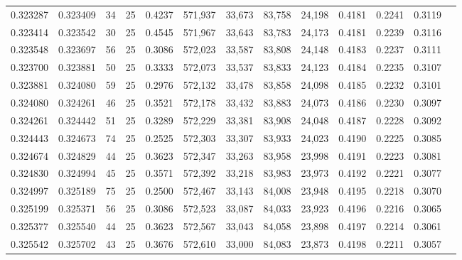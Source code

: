 \begin{tabular}{rrrrrrrrrrrrr}
0.323287 & 0.323409 &    34 &  25 &                                     0.4237 & 571,937 &  33,673 &  83,758 &  24,198 & 0.4181 & 0.2241 & 0.3119 \\
0.323414 & 0.323542 &    30 &  25 &                                     0.4545 & 571,967 &  33,643 &  83,783 &  24,173 & 0.4181 & 0.2239 & 0.3116 \\
0.323548 & 0.323697 &    56 &  25 &                                     0.3086 & 572,023 &  33,587 &  83,808 &  24,148 & 0.4183 & 0.2237 & 0.3111 \\
0.323700 & 0.323881 &    50 &  25 &                                     0.3333 & 572,073 &  33,537 &  83,833 &  24,123 & 0.4184 & 0.2235 & 0.3107 \\
0.323881 & 0.324080 &    59 &  25 &                                     0.2976 & 572,132 &  33,478 &  83,858 &  24,098 & 0.4185 & 0.2232 & 0.3101 \\
0.324080 & 0.324261 &    46 &  25 &                                     0.3521 & 572,178 &  33,432 &  83,883 &  24,073 & 0.4186 & 0.2230 & 0.3097 \\
0.324261 & 0.324442 &    51 &  25 &                                     0.3289 & 572,229 &  33,381 &  83,908 &  24,048 & 0.4187 & 0.2228 & 0.3092 \\
0.324443 & 0.324673 &    74 &  25 &                                     0.2525 & 572,303 &  33,307 &  83,933 &  24,023 & 0.4190 & 0.2225 & 0.3085 \\
0.324674 & 0.324829 &    44 &  25 &                                     0.3623 & 572,347 &  33,263 &  83,958 &  23,998 & 0.4191 & 0.2223 & 0.3081 \\
0.324830 & 0.324994 &    45 &  25 &                                     0.3571 & 572,392 &  33,218 &  83,983 &  23,973 & 0.4192 & 0.2221 & 0.3077 \\
0.324997 & 0.325189 &    75 &  25 &                                     0.2500 & 572,467 &  33,143 &  84,008 &  23,948 & 0.4195 & 0.2218 & 0.3070 \\
0.325199 & 0.325371 &    56 &  25 &                                     0.3086 & 572,523 &  33,087 &  84,033 &  23,923 & 0.4196 & 0.2216 & 0.3065 \\
0.325377 & 0.325540 &    44 &  25 &                                     0.3623 & 572,567 &  33,043 &  84,058 &  23,898 & 0.4197 & 0.2214 & 0.3061 \\
0.325542 & 0.325702 &    43 &  25 &                                     0.3676 & 572,610 &  33,000 &  84,083 &  23,873 & 0.4198 & 0.2211 & 0.3057 \\

\end{tabular}
